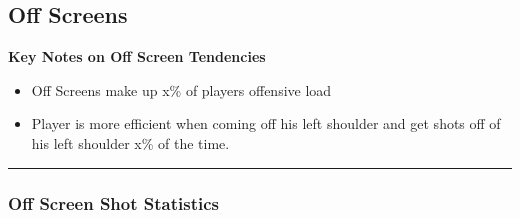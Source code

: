 \documentclass[a4paper,12pt]{article}
\begin{document}
\subsection{Off Screens}
\vspace{1.25em} %
\textbf{Key Notes on Off Screen Tendencies}
\vspace{0.5em} %

\begin{itemize}
    \item Off Screens make up x\% of players offensive load
    \vspace{0.3em} %
    \item Player is more efficient when coming off his left shoulder and get shots off of his left shoulder x\% of the time.
\end{itemize}

\vspace{1em} %
\hrule height 1pt width 1\textwidth %
\vspace{0em} %

\subsubsection{Off Screen Shot Statistics}
\end{document}
